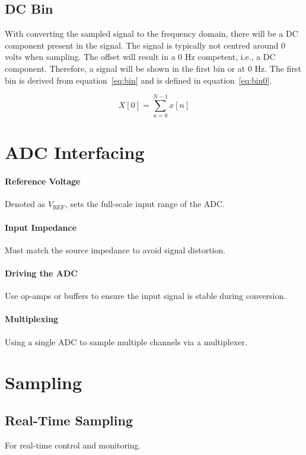 \subsection{DC Bin}
With converting the sampled signal to the frequency domain, there will be a DC component present in the signal. The signal is typically not centred around 0 volts when sampling. The offset will result in a 0 Hz competent, i.e., a DC component. Therefore, a signal will be shown in the first bin or at 0 Hz.
The first bin is derived from equation~\ref{eq:bin} and is defined in equation~\ref{eq:bin0}.

\begin{equation}\label{eq:bin0}
  X[0] = \sum_{n=0}^{N-1} x[n]
\end{equation}



\section{ADC Interfacing}

\paragraph{Reference Voltage} Denoted as $V_{\text{REF}}$, sets the full-scale input range of the ADC.

\paragraph{Input Impedance} Must match the source impedance to avoid signal distortion.

\paragraph{Driving the ADC} Use op-amps or buffers to ensure the input signal is stable during conversion.

\paragraph{Multiplexing} Using a single ADC to sample multiple channels via a multiplexer.




\section{Sampling}
\subsection{Real-Time Sampling}
For real-time control and monitoring.

